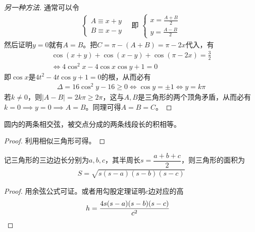 \begin{proof}[另一种方法]
  通常可以令
  \begin{align*}
    \begin{cases}
      A\equiv x+y\\
      B\equiv x-y
    \end{cases}\quad\text{即\ }
    \begin{cases}
      x = \frac{A+B}{2}\\
      y = \frac{A-B}{2}
    \end{cases}
  \end{align*}
  然后证明$y=0$就有$A=B$。把$C=\pi - (A+B) = \pi - 2x$代入，有
  \begin{align*}
    \cos(x+y) + \cos(x-y) + \cos(\pi - 2x) = \frac32 \\
    \iff 4\cos^2x -4\cos x\cos y + 1 = 0
  \end{align*}
  即$\cos x$是$4t^2 - 4t\cos y + 1=0$的根，从而必有
  \begin{align*}
    \Delta = 16\cos^2y - 16 \ge 0 \iff \cos y = \pm 1 \iff y=k\pi
  \end{align*}
  若$k\ne 0$，则$|A-B| = 2k\pi\ge 2\pi$，这与$A,B$是三角形的两个顶角矛盾，从而必有$k=0\implies y=0\implies A=B$。同理可得$A=B=C$。
\end{proof}


\begin{theorem}
  圆内的两条相交弦，被交点分成的两条线段长的积相等。
\end{theorem}
\begin{proof}
  利用相似三角形可得。
\end{proof}

\begin{theorem}
  记三角形的三边边长分别为$a,b,c$，其半周长$s=\dfrac{a+b+c}2$，则三角形的面积为
  \begin{align}
    S=\sqrt{s(s-a)(s-b)(s-c)}
  \end{align}
\end{theorem}
\begin{proof}
  用余弦公式可证。或者用勾股定理证明$c$边对应的高
  \begin{align*}
    h=\frac{4s(s-a)(s-b)(s-c)}{c^2} &\qedhere
  \end{align*}
\end{proof}


